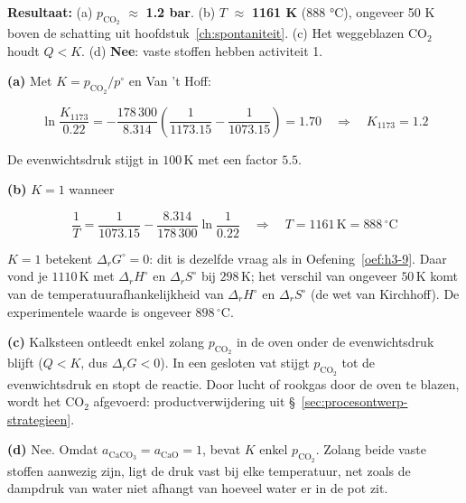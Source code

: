 \begin{oplossing}
\textbf{Resultaat:} (a) \(p_{\mathrm{CO_2}}\) \ensuremath{\approx{}} \textbf{1.2 bar}. (b) \(T\) \ensuremath{\approx{}} \textbf{1161 K} (888 °C), ongeveer 50 K boven de schatting uit hoofdstuk~\ref{ch:spontaniteit}. (c) Het weggeblazen CO\ensuremath{_{2}} houdt \textbf{\(Q < K\)}. (d) \textbf{Nee}: vaste stoffen hebben activiteit 1.

\textbf{(a)} Met \(K = p_{\mathrm{CO_2}}/p^\circ\) en Van 't Hoff:

\[
\ln\frac{K_{1173}}{0.22} = -\frac{178\,300}{8.314}\left(\frac{1}{1173.15} - \frac{1}{1073.15}\right) = 1.70 \quad\Rightarrow\quad K_{1173} = 1.2
\]

De evenwichtsdruk stijgt in \(100\,\mathrm{K}\) met een factor \(5.5\).

\textbf{(b)} \(K = 1\) wanneer

\[
\frac{1}{T} = \frac{1}{1073.15} - \frac{8.314}{178\,300}\ln\frac{1}{0.22} \quad\Rightarrow\quad T = 1161\,\mathrm{K} = 888\,^\circ\mathrm{C}
\]

\(K = 1\) betekent \(\Delta_r G^\circ = 0\): dit is dezelfde vraag als in Oefening~\ref{oef:h3-9}. Daar vond je \(1110\,\mathrm{K}\) met \(\Delta_r H^\circ\) en \(\Delta_r S^\circ\) bij \(298\,\mathrm{K}\); het verschil van ongeveer \(50\,\mathrm{K}\) komt van de temperatuurafhankelijkheid van \(\Delta_r H^\circ\) en \(\Delta_r S^\circ\) (de wet van Kirchhoff). De experimentele waarde is ongeveer \(898\,^\circ\mathrm{C}\).

\textbf{(c)} Kalksteen ontleedt enkel zolang \(p_{\mathrm{CO_2}}\) in de oven onder de evenwichtsdruk blijft (\(Q < K\), dus \(\Delta_r G < 0\)). In een gesloten vat stijgt \(p_{\mathrm{CO_2}}\) tot de evenwichtsdruk en stopt de reactie. Door lucht of rookgas door de oven te blazen, wordt het \(\mathrm{CO_2}\) afgevoerd: productverwijdering uit \S~\ref{sec:procesontwerp-strategieen}.

\textbf{(d)} Nee. Omdat \(a_{\mathrm{CaCO_3}} = a_{\mathrm{CaO}} = 1\), bevat \(K\) enkel \(p_{\mathrm{CO_2}}\). Zolang beide vaste stoffen aanwezig zijn, ligt de druk vast bij elke temperatuur, net zoals de dampdruk van water niet afhangt van hoeveel water er in de pot zit.
\end{oplossing}

